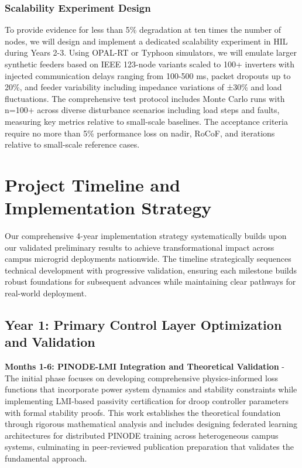 \documentclass[12pt]{article}
\begin{document}
\subsubsection{Scalability Experiment Design}

To provide evidence for less than 5\% degradation at ten times the number of nodes, we will design and implement a dedicated scalability experiment in HIL during Years 2-3. Using OPAL-RT or Typhoon simulators, we will emulate larger synthetic feeders based on IEEE 123-node variants scaled to 100+ inverters with injected communication delays ranging from 100-500 ms, packet dropouts up to 20\%, and feeder variability including impedance variations of ±30\% and load fluctuations. The comprehensive test protocol includes Monte Carlo runs with n=100+ across diverse disturbance scenarios including load steps and faults, measuring key metrics relative to small-scale baselines. The acceptance criteria require no more than 5\% performance loss on nadir, RoCoF, and iterations relative to small-scale reference cases.

\section{Project Timeline and Implementation Strategy}

Our comprehensive 4-year implementation strategy systematically builds upon our validated preliminary results to achieve transformational impact across campus microgrid deployments nationwide. The timeline strategically sequences technical development with progressive validation, ensuring each milestone builds robust foundations for subsequent advances while maintaining clear pathways for real-world deployment.

\subsection{Year 1: Primary Control Layer Optimization and Validation}

\textbf{Months 1-6: PINODE-LMI Integration and Theoretical Validation} - The initial phase focuses on developing comprehensive physics-informed loss functions that incorporate power system dynamics and stability constraints while implementing LMI-based passivity certification for droop controller parameters with formal stability proofs. This work establishes the theoretical foundation through rigorous mathematical analysis and includes designing federated learning architectures for distributed PINODE training across heterogeneous campus systems, culminating in peer-reviewed publication preparation that validates the fundamental approach.
\end{document}

